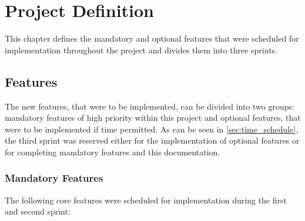 \chapter{Project Definition\label{ch:project_definition}}

This chapter defines the mandatory and optional features that were scheduled for implementation throughout the
project and divides them into three sprints.

\section{Features\label{sec:features}}

The new features, that were to be implemented, can be divided into two groups: mandatory features of high priority within this project and optional features, that were to be implemented if time permitted. As can be seen in \autoref{sec:time_schedule}, the third sprint was reserved either for the implementation of optional features or for completing mandatory features and this documentation.

\subsection{Mandatory Features}

The following core features were scheduled for implementation during the first and
second sprint:

